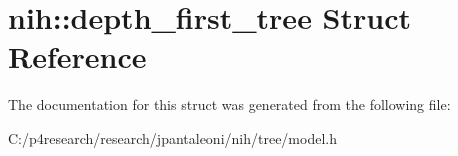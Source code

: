 \hypertarget{structnih_1_1depth__first__tree}{
\section{nih\-:\-:depth\-\_\-first\-\_\-tree \-Struct \-Reference}
\label{structnih_1_1depth__first__tree}
}


\-The documentation for this struct was generated from the following file\-:\begin{DoxyCompactItemize}
\item 
\-C\-:/p4research/research/jpantaleoni/nih/tree/model.\-h\end{DoxyCompactItemize}
